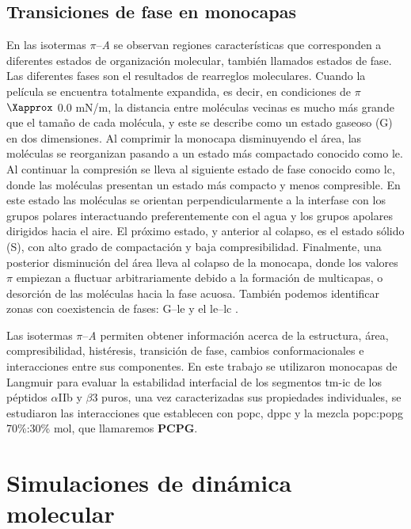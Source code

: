 \subsection{Transiciones de fase en monocapas}

En las isotermas $\pi$--\textit{A} se observan regiones características que corresponden
a diferentes estados de organización molecular, también llamados estados de fase. Las diferentes fases son el resultados de rearreglos moleculares. Cuando la película se encuentra totalmente expandida, es decir, en condiciones de $\pi$ $\Xapprox$ 0.0 mN/m, la distancia entre moléculas vecinas es mucho más grande que el tamaño de cada molécula, y este se describe como un estado gaseoso (G) en dos dimensiones. Al comprimir la monocapa disminuyendo el área, las moléculas se reorganizan pasando a un estado más compactado conocido como \ac{le}. Al continuar la compresión se lleva al siguiente estado de fase conocido como \ac{lc}, donde las moléculas presentan un estado más compacto y menos compresible. En este estado las moléculas se orientan perpendicularmente a la interfase con  los grupos polares interactuando preferentemente con el agua y los grupos apolares dirigidos hacia el aire. El próximo estado, y anterior al colapso, es el estado sólido (S), con alto grado de compactación y baja compresibilidad. Finalmente, una posterior disminución del área lleva al colapso de la monocapa, donde los valores $\pi$ empiezan a fluctuar arbitrariamente debido a la formación de multicapas, o desorción de las moléculas hacia la fase acuosa. También podemos identificar zonas con coexistencia de fases:  G--\ac{le} y el \ac{le}--\ac{lc} \citep{Nagle1986}.

Las isotermas $\pi$--\textit{A}  permiten obtener información acerca de la estructura, área, compresibilidad, histéresis, transición de fase, cambios conformacionales e interacciones entre sus componentes. En este trabajo se utilizaron monocapas de Langmuir para evaluar la estabilidad interfacial de los segmentos \ac{tm}-\ac{ic} de los péptidos $\alpha$IIb y $\beta$3 puros, una vez caracterizadas sus propiedades individuales, se estudiaron las interacciones que establecen con \ac{popc}, \ac{dppc} y la mezcla \ac{popc}:\ac{popg} 70\%:30\% mol, que llamaremos \textbf{PCPG}.


\section{Simulaciones de dinámica molecular}

